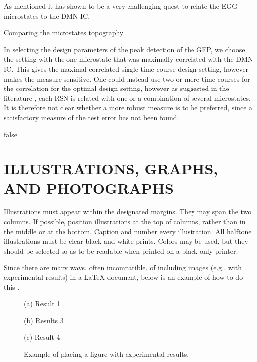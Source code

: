 \documentclass{article}
\begin{document}
As mentioned it has shown to be a very challenging quest to relate the EGG microstates to the DMN IC.

Comparing the microstates topography 

In selecting the design parameters of the peak detection of the GFP, we choose the setting with the one microstate that was maximally correlated with the DMN IC. This gives the maximal correlated single time course design setting, however  makes the measure sensitive. One could instead use two or more time courses for the correlation for the optimal design setting, however as suggested in the literature \cite{Yuan20122062}, each RSN is related with one or a combination of several microstates. It is therefore not clear whether a more robust measure is to be preferred, since a satisfactory measure of the test error has not been found.

\if false
\section{ILLUSTRATIONS, GRAPHS, AND PHOTOGRAPHS}
\label{sec:illust}

Illustrations must appear within the designated margins.  They may span the two
columns.  If possible, position illustrations at the top of columns, rather
than in the middle or at the bottom.  Caption and number every illustration.
All halftone illustrations must be clear black and white prints.  Colors may be
used, but they should be selected so as to be readable when printed on a
black-only printer.

Since there are many ways, often incompatible, of including images (e.g., with
experimental results) in a LaTeX document, below is an example of how to do
this \cite{Lamp86}.

\begin{figure}[htb]

\begin{minipage}[b]{1.0\linewidth}
  \centering
  \centerline{(a) Result 1}\medskip
\end{minipage}
%
\begin{minipage}[b]{.48\linewidth}
  \centering
  \centerline{(b) Results 3}\medskip
\end{minipage}
\hfill
\begin{minipage}[b]{0.48\linewidth}
  \centering
  \centerline{(c) Result 4}\medskip
\end{minipage}
%
\caption{Example of placing a figure with experimental results.}
\label{fig:res}
%
\end{figure}
\end{document}
